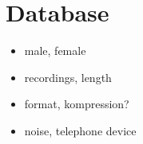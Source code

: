 \section{Database}

\begin{itemize}
    \item male, female
	\item recordings, length
	\item format, kompression?
	\item noise, telephone device
\end{itemize}



